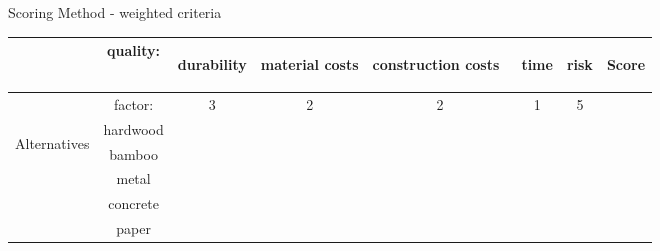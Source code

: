 \begin{frame}{Scoring Method - weighted criteria}
    \begin{tabular}{|c|c|c|c|c|c|c|c|}
    \hline 
     & quality: & \begin{turn}{90}
    durability
    \end{turn} & \begin{turn}{90}
    material costs
    \end{turn} & \begin{turn}{90}
    construction costs~
    \end{turn} & \begin{turn}{90}
    time
    \end{turn} & \begin{turn}{90}
    risk
    \end{turn} &  \begin{turn}{90}
    Score
    \end{turn}\tabularnewline
    \hline 
     & factor: & 3 & 2 & 2 & 1 & 5 & \tabularnewline
    \hline 
    \hline 
    \multirow{5}{*}{\begin{turn}{90}
    Alternatives
    \end{turn}} & hardwood &  &  &  &  &  & \tabularnewline
    \cline{2-8} 
     & bamboo &  &  &  &  &  & \tabularnewline
    \cline{2-8} 
     & metal &  &  &  &  &  & \tabularnewline
    \cline{2-8} 
     & concrete &  &  &  &  &  & \tabularnewline
    \cline{2-8} 
     & paper &  &  &  &  &  & \tabularnewline
    \hline 
    \end{tabular}
    \mytext{
    
    \vfill
    }
\end{frame}


